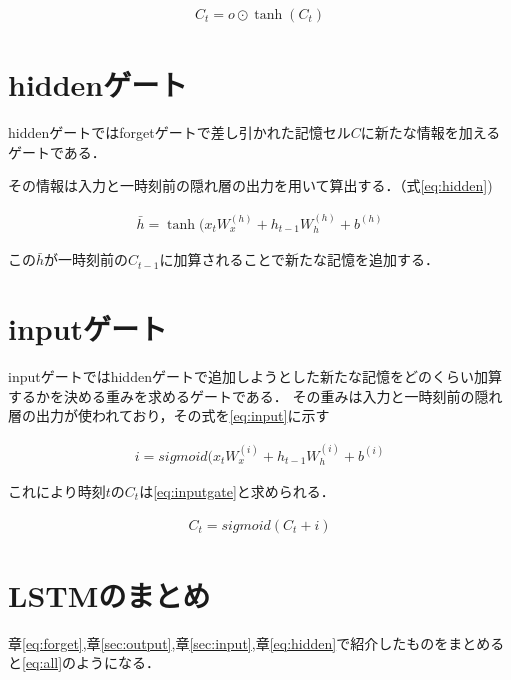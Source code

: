 \documentclass[a4j,11pt,report]{jsbook}
\begin{document}
\begin{equation}
  \label{eq:outputgate}
  \begin{split}
    C_{t} = o \odot \tanh(C_{t})
  \end{split}
\end{equation}

\section{hiddenゲート\label{sec:hidden}}

hiddenゲートではforgetゲートで差し引かれた記憶セル$C$に新たな情報を加えるゲートである．

その情報は入力と一時刻前の隠れ層の出力を用いて算出する．（式\ref{eq:hidden})


\begin{equation}
  \label{eq:hidden}
  \begin{split}
    \bar{h} = \tanh(x_{t}W_{x}^{(h)} + h_{t-1}W_{h}^{(h)} + b^{(h)}
  \end{split}
\end{equation}

この$\bar{h}$が一時刻前の$C_{t-1}$に加算されることで新たな記憶を追加する．


\section{inputゲート\label{sec:input}}

inputゲートではhiddenゲートで追加しようとした新たな記憶をどのくらい加算するかを決める重みを求めるゲートである．
その重みは入力と一時刻前の隠れ層の出力が使われており，その式を\ref{eq:input}に示す


\begin{equation}
  \label{eq:input}
  \begin{split}
    i = sigmoid(x_{t}W_{x}^{(i)} + h_{t-1}W_{h}^{(i)} + b^{(i)}
  \end{split}
\end{equation}

これにより時刻$t$の$C_{t}$は\ref{eq:inputgate}と求められる．

\begin{equation}
  \label{eq:inputgate}
  \begin{split}
    C_{t} = sigmoid (C_{t} + i )
  \end{split}
\end{equation}

\section{LSTMのまとめ}
章\ref{eq:forget},章\ref{sec:output},章\ref{sec:input},章\ref{eq:hidden}で紹介したものをまとめると\ref{eq:all}のようになる．
\end{document}

